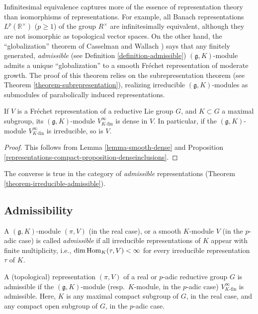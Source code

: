 \begin{remark}
 \label{remark-infinitesimal-equivalence}
Infinitesimal equivalence captures more of the essence of representation theory than isomorphisms of representations. For example, all Banach representations $L^p(\mathbb R^\times)$ ($p\ge 1$) of the group $R^\times$ are infinitesimally equivalent, although they are not isomorphic as topological vector spaces. On the other hand, the ``globalization'' theorem of Casselman and Wallach \cite{Casselman-canonicalextensions, Wallach-RR2, Bernstein-Kroetz}) says that any finitely generated, \emph{admissible} (see Definition \ref{definition-admissible}) $(\mathfrak g, K)$-module admits a unique ``globalization'' to a smooth Fr\'echet representation of moderate growth. The proof of this theorem relies on the subrepresentation theorem (see Theorem \ref{theorem-subrepresentation}), realizing irreducible $(\mathfrak g,K)$-modules as submodules of parabolically induced representations.
\end{remark}



\begin{lemma}
 \label{lemma-gK-dense}
If $V$ is a Fr\'echet representation of a reductive Lie group $G$, and $K\subset G$ a maximal subgroup, its $(\mathfrak g,K)$-module $V^\infty_{K\text{-fin}}$ is dense in $V$. In particular, if the $(\mathfrak g, K)$-module $V^\infty_{K\text{-fin}}$ is irreducible, so is $V$. 
\end{lemma}

\begin{proof}
 This follows from Lemma \ref{lemma-smooth-dense} and Proposition \ref{representations-compact-proposition-denseinclusions}. 
\end{proof}

The converse is true in the category of \emph{admissible} representations (Theorem \ref{theorem-irreducible-admissible}). 


\subsection{Admissibility}
\label{subsection-admissibility}


\begin{definition}
 \label{definition-admissible}
A $(\mathfrak g, K)$-module $(\pi, V)$ (in the real case), or a smooth $K$-module $V$ (in the $p$-adic case) is called {\it admissible} if  all irreducible representations of $K$ appear with finite multiplicity, i.e., $\dim\mathop{\rm Hom}\nolimits_K(\tau, V)<\infty$ for every irreducible representation $\tau$ of $K$. 

A (topological) representation $(\pi, V)$ of a real or $p$-adic reductive group $G$ is admissible if the $(\mathfrak g, K)$-module (resp.\ $K$-module, in the $p$-adic case) $V^\infty_{K\text{-fin}}$ is admissible. Here, $K$ is any maximal compact subgroup of $G$, in the real case, and any compact open subgroup of $G$, in the $p$-adic case.
\end{definition}


